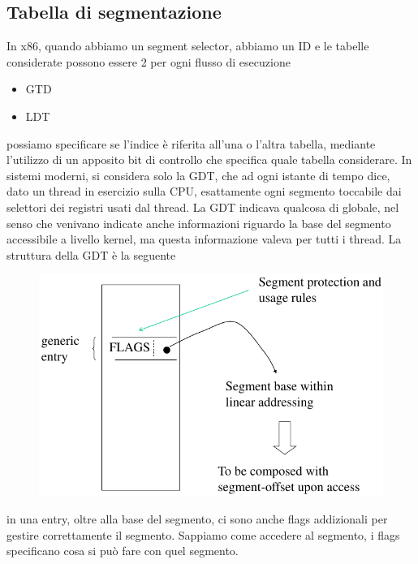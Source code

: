 \documentclass[12pt, oneside]{extbook}
\begin{document}
\subsection{Tabella di segmentazione}
In x86, quando abbiamo un segment selector, abbiamo un ID e le tabelle considerate possono essere 2 per ogni flusso di esecuzione
\begin{itemize}
\item GTD
\item LDT
\end{itemize}
possiamo specificare se l'indice è riferita all'una o l'altra tabella, mediante l'utilizzo di un apposito bit di controllo che specifica quale tabella considerare. In sistemi moderni, si considera solo la GDT, che ad ogni istante di tempo dice, dato un thread in esercizio sulla CPU, esattamente ogni segmento toccabile dai selettori dei registri usati dal thread. La GDT indicava qualcosa di globale, nel senso che venivano indicate anche informazioni riguardo la base del segmento accessibile a livello kernel, ma questa informazione valeva per tutti i thread. La struttura della GDT è la seguente
\begin{figure}[!h]
	\includegraphics[scale=0.3]{immagini/gdt_table.png}
\end{figure}
in una entry, oltre alla base del segmento, ci sono anche flags addizionali per gestire correttamente il segmento. Sappiamo come accedere al segmento, i flags specificano cosa si può fare con quel segmento.
\end{document}

